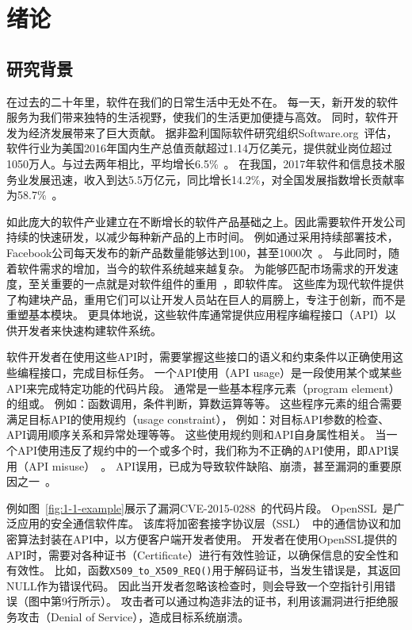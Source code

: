 \chapter{绪论}
\label{cha:intro}

\section{研究背景}
在过去的二十年里，软件在我们的日常生活中无处不在。
每一天，新开发的软件服务为我们带来独特的生活视野，使我们的生活更加便捷与高效。
同时，软件开发为经济发展带来了巨大贡献。
据非盈利国际软件研究组织Software.org~\cite{software-org}评估，软件行业为美国2016年国内生产总值贡献超过1.14万亿美元，提供就业岗位超过1050万人。与过去两年相比，平均增长6.5\%~\cite{2017-eco-report}。
在我国，2017年软件和信息技术服务业发展迅速，收入到达5.5万亿元，同比增长14.2\%，对全国发展指数增长贡献率为58.7\%~\cite{2018-china-report}。


如此庞大的软件产业建立在不断增长的软件产品基础之上。因此需要软件开发公司持续的快速研发，以减少每种新产品的上市时间。
例如通过采用持续部署技术，Facebook公司每天发布的新产品数量能够达到100，甚至1000次~\cite{16-icse-continuous}。
与此同时，随着软件需求的增加，当今的软件系统越来越复杂。
为能够匹配市场需求的开发速度，至关重要的一点就是对软件组件的重用~\cite{2011-icsr-reuse, 2013-cbse-reuse}，即软件库。
这些库为现代软件提供了构建块产品，重用它们可以让开发人员站在巨人的肩膀上，专注于创新，而不是重塑基本模块。
更具体地说，这些软件库通常提供应用程序编程接口（API）以供开发者来快速构建软件系统。


软件开发者在使用这些API时，需要掌握这些接口的语义和约束条件以正确使用这些编程接口，完成目标任务。
一个API使用（API usage）是一段使用某个或某些API来完成特定功能的代码片段。
通常是一些基本程序元素（program element）的组或。
例如：函数调用，条件判断，算数运算等等。
这些程序元素的组合需要满足目标API的使用规约（usage constraint），
例如：对目标API参数的检查、API调用顺序关系和异常处理等等。
这些使用规约则和API自身属性相关。
当一个API使用违反了规约中的一个或多个时，我们称为不正确的API使用，即API误用（API misuse）~\cite{16-msr-mubench}。
API误用，已成为导致软件缺陷、崩溃，甚至漏洞的重要原因之一~\cite{12-ccs-android,12-ccs-ssl,13-ccs-misuse,13-tse-missing-call,14-apsys-case,15-icpc-api,16-ase-spec}。


例如图~\ref{fig:1-1-example}展示了漏洞CVE-2015-0288~\cite{CVE-2015-0288}的代码片段。
OpenSSL~\cite{openssl}是广泛应用的安全通信软件库。
该库将加密套接字协议层（SSL）~\cite{ssl}中的通信协议和加密算法封装在API中，以方便客户端开发者使用。
开发者在使用OpenSSL提供的API时，需要对各种证书（Certificate）进行有效性验证，以确保信息的安全性和有效性。
比如，函数\texttt{X509\_to\_X509\_REQ()}用于解码证书，当发生错误是，其返回NULL作为错误代码。
因此当开发者忽略该检查时，则会导致一个空指针引用错误（图中第9行所示）。
攻击者可以通过构造非法的证书，利用该漏洞进行拒绝服务攻击（Denial of Service），造成目标系统崩溃。



